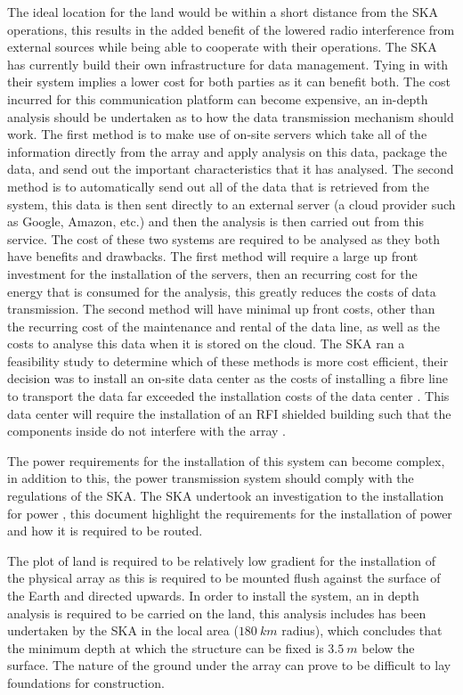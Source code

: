 \documentclass[11pt]{witseiepaper}
\begin{document}
The ideal location for the land would be within a short distance from the SKA operations, this results in the added benefit of the lowered radio interference from external sources while being able to cooperate with their operations. 
The SKA has currently build their own infrastructure for data management. Tying in with their system implies a lower cost for both parties as it can benefit both. The cost incurred for this communication platform can become expensive, an in-depth analysis should be undertaken as to how the data transmission mechanism should work.
The first method is to make use of on-site servers which take all of the information directly from the array and apply analysis on this data, package the data, and send out the important characteristics that it has analysed. The second method is to automatically send out all of the data that is retrieved from the system, this data is then sent directly to an external server (a cloud provider such as Google, Amazon, etc.) and then the analysis is then carried out from this service.
The cost of these two systems are required to be analysed as they both have benefits and drawbacks.
The first method will require a large up front investment for the installation of the servers, then an recurring cost for the energy that is consumed for the analysis, this greatly reduces the costs of data transmission.
The second method will have minimal up front costs, other than the recurring cost of the maintenance and rental of the data line, as well as the costs to analyse this data when it is stored on the cloud.
The SKA ran a feasibility study to determine which of these methods is more cost efficient, their decision was to install an on-site data center as the costs of installing a fibre line to transport the data far exceeded the installation costs of the data center \cite[p.~17-18]{SKAFibre}.
This data center will require the installation of an RFI shielded building such that the components inside do not interfere with the array \cite[p.~18]{SKAFibre}.

The power requirements for the installation of this system can become complex, in addition to this, the power transmission system should comply with the regulations of the SKA. The SKA undertook an investigation to the installation for power \cite{SKAFibre}, this document highlight the requirements for the installation of power and how it is required to be routed.


The plot of land is required to be relatively low gradient for the installation of the physical array as this is required to be mounted flush against the surface of the Earth and directed upwards.
In order to install the system, an in depth analysis is required to be carried on the land, this analysis includes has been undertaken by the SKA in the local area ($180~km$ radius)\cite[p.~95,98]{SKAFibre}, which concludes that the minimum depth at which the structure can be fixed is $3.5~m$ below the surface. The nature of the ground under the array can prove to be difficult to lay foundations for construction.
\end{document}
